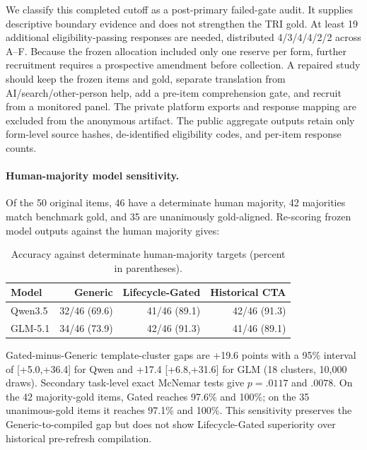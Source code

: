 \documentclass[10pt]{article}
\begin{document}
We classify this completed cutoff as a post-primary failed-gate audit. It supplies descriptive
boundary evidence and does not strengthen the TRI gold. At least 19 additional eligibility-passing
responses are needed, distributed 4/3/4/4/2/2 across A--F. Because the frozen allocation included only one reserve per
form, further recruitment requires a prospective amendment before collection. A repaired study
should keep the frozen items and gold, separate translation from AI/search/other-person help, add
a pre-item comprehension gate, and recruit from a monitored panel. The private platform exports
and response mapping are excluded from the anonymous artifact. The public aggregate outputs retain
only form-level source hashes, de-identified eligibility codes, and per-item response counts.

\paragraph{Human-majority model sensitivity.}
Of the 50 original items, 46 have a determinate human majority, 42 majorities match benchmark
gold, and 35 are unanimously gold-aligned. Re-scoring frozen model outputs against the human
majority gives:
\begin{table}[H]
\centering
\small
\begin{tabular}{lrrr}
\toprule
Model & Generic & Lifecycle-Gated & Historical CTA\\
\midrule
Qwen3.5 & 32/46 (69.6) & 41/46 (89.1) & 42/46 (91.3)\\
GLM-5.1 & 34/46 (73.9) & 42/46 (91.3) & 41/46 (89.1)\\
\bottomrule
\end{tabular}
\caption{Accuracy against determinate human-majority targets (percent in parentheses).}
\end{table}
Gated-minus-Generic template-cluster gaps are +19.6 points with a 95\% interval of
[+5.0,+36.4] for Qwen and +17.4 [+6.8,+31.6] for GLM (18 clusters, 10,000 draws).
Secondary task-level exact McNemar tests give $p=.0117$ and $.0078$.
On the 42 majority-gold items, Gated reaches 97.6\% and 100\%; on the 35 unanimous-gold
items it reaches 97.1\% and 100\%. This sensitivity preserves the Generic-to-compiled gap but
does not show Lifecycle-Gated superiority over historical pre-refresh compilation.
\end{document}
